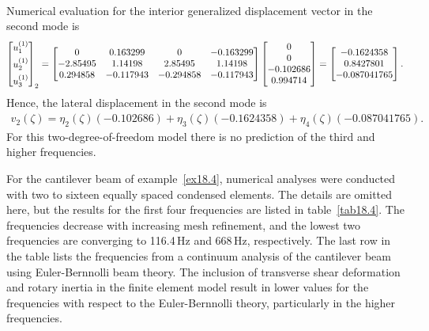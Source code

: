 \documentclass{AeroStructure-ERJohnson}
\begin{document}
\begin{example}
\begin{align}
\end{align}
Numerical evaluation for the interior generalized displacement vector in the second mode is
\begin{align}\label{ex18.4o}
\left[\begin{array}{@{}l@{}}u_{1}^{(1)} \\[4pt] u_{2}^{(1)} \\[4pt] u_{3}^{(1)}\end{array}\right]_{2}=\left[\begin{array}{@{}cccc@{}}0 & 0.163299 & 0 & -0.163299 \\-2.85495 & 1.14198 & 2.85495 & 1.14198 \\0.294858 & -0.117943 & -0.294858 & -0.117943\end{array}\right]\left[\begin{array}{@{}c@{}}0 \\0 \\-0.102686 \\0.994714\end{array}\right]=\left[\begin{array}{@{}c@{}}-0.1624358 \\0.8427801 \\-0.087041765\end{array}\right].
\end{align}
Hence, the lateral displacement in the second mode is
\begin{align}\label{ex18.4p}
v_{2}(\zeta)=\eta_{2}(\zeta)(-0.102686)+\eta_{3}(\zeta)(-0.1624358)+\eta_{4}(\zeta)(-0.087041765).
\end{align}
For this two-degree-of-freedom model there is no prediction of the third and higher frequencies.
\end{example}

For the cantilever beam of example~\ref{ex18.4}, numerical analyses were conducted with two to sixteen equally spaced condensed elements. The details are omitted here, but the results for the first four frequencies are listed in table~\ref{tab18.4}. The frequencies decrease with increasing mesh refinement, and the lowest two frequencies are converging to 116.4\,Hz and 668\,Hz, respectively. The last row in the table lists the frequencies from a continuum analysis of the cantilever beam using Euler-Bernnolli beam theory. The inclusion of transverse shear deformation and rotary inertia in the finite element model result in lower values for the frequencies with respect to the Euler-Bernnolli theory, particularly in the higher frequencies.
\end{document}
